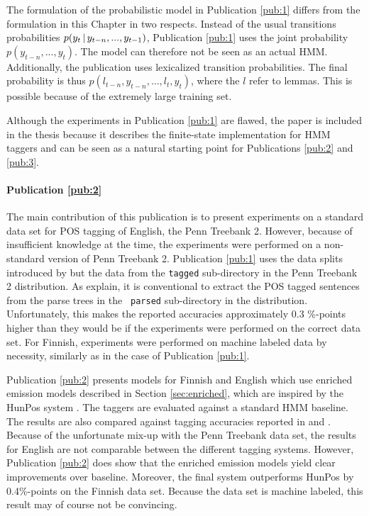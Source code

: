 The formulation of the probabilistic model in Publication \ref{pub:1}
differs from the formulation in this Chapter in two respects. Instead
of the usual transitions probabilities $p(y_{t}\mbox{$ \, | \, $} y_{t-n}, ...,
y_{t-1})$, Publication \ref{pub:1} uses the joint probability
$p(y_{t-n}, ..., y_t)$. The model can therefore not be seen as an
actual HMM. Additionally, the publication uses lexicalized transition
probabilities. The final probability is thus $p(l_{t-n}, y_{t-n}, ...,
l_t, y_t)$, where the $l$ refer to lemmas. This is possible because of
the extremely large training set.

Although the experiments in Publication \ref{pub:1} are flawed, the
paper is included in the thesis because it describes the finite-state
implementation for HMM taggers and can be seen as a natural starting
point for Publications \ref{pub:2} and \ref{pub:3}.

\paragraph{Publication \ref{pub:2}} The main contribution of this
publication is to present experiments on a standard data set for POS
tagging of English, the Penn Treebank 2. However, because of
insufficient knowledge at the time, the experiments were performed on
a non-standard version of Penn Treebank 2. Publication \ref{pub:1}
uses the data splits introduced by \cite{Collins2002} but the data
from the {\tt tagged} sub-directory in the Penn Treebank 2
distribution. As \cite{Toutanova2003} explain, it is conventional to
extract the POS tagged sentences from the parse trees in the {\tt
  parsed} sub-directory in the distribution. Unfortunately, this makes
the reported accuracies approximately 0.3 \%-points higher than they
would be if the experiments were performed on the correct data
set. For Finnish, experiments were performed on machine labeled data by
necessity, similarly as in the case of Publication \ref{pub:1}.

Publication \ref{pub:2} presents models for Finnish and English which
use enriched emission models described in Section \ref{sec:enriched},
which are inspired by the HunPos system \citep{Halacsy2007}. The
taggers are evaluated against a standard HMM baseline. The results are
also compared against tagging accuracies reported in \cite{Brants2000}
and \cite{Halacsy2007}. Because of the unfortunate mix-up with the
Penn Treebank data set, the results for English are not comparable
between the different tagging systems. However, Publication
\ref{pub:2} does show that the enriched emission models yield clear
improvements over baseline. Moreover, the final system outperforms
HunPos by 0.4\%-points on the Finnish data set. Because the data set
is machine labeled, this result may of course not be convincing.

